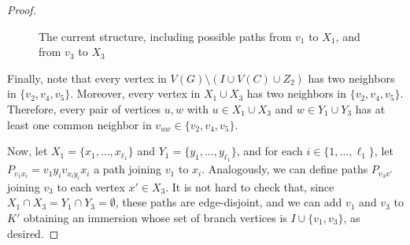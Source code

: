 \documentclass[a4paper,12pt]{article}
\begin{document}
\begin{proof}
\begin{figure}[h]
\caption{The current structure, including possible paths from $v_1$ to $X_1$, and from $v_3$ to $X_3$}
\end{figure}


    Finally, note that every vertex in $V(G)\setminus(I\cup V(C)\cup Z_2)$ has two neighbors in $\{v_2, v_4, v_5\}$.
    Moreover, every vertex in $X_1\cup X_3$ has two neighbors in $\{v_2, v_4, v_5\}$.
    Therefore, every pair of vertices $u,w$ with $u\in X_1\cup X_3$ and $w\in Y_1\cup Y_3$ has at least one common neighbor in $v_{uw}\in\{v_2, v_4, v_5\}$.

    Now, let \(X_1 = \{x_1,\ldots,x_{\ell_1}\}\) and \(Y_1 = \{y_1,\ldots,y_{\ell_1}\}\),
    and for each \(i \in \{1,\ldots,\ell_1\}\), let \(P_{v_1 x_i} = v_1 y_i v_{x_iy_i} x_i\) a path joining \(v_1\) to \(x_i\).
    Analogously, we can define paths \(P_{v_3 x'}\) joining \(v_3\) to each vertex \(x'\in X_3\).
    It is not hard to check that, since \(X_1 \cap X_3 = Y_1 \cap Y_3 = \emptyset\),
    these paths are edge-disjoint,
    and we can add \(v_1\) and \(v_3\) to \(K'\)
    obtaining an immersion whose set of branch vertices is \(I\cup \{v_1,v_3\}\),
    as desired.
    \end{proof}

%
\end{document}
